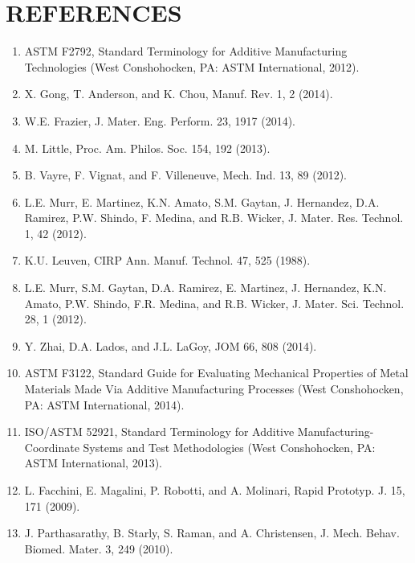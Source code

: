 \documentclass[10pt]{article}
\begin{document}
\section*{REFERENCES}
\begin{enumerate}
  \item ASTM F2792, Standard Terminology for Additive Manufacturing Technologies (West Conshohocken, PA: ASTM International, 2012).

  \item X. Gong, T. Anderson, and K. Chou, Manuf. Rev. 1, 2 (2014).

  \item W.E. Frazier, J. Mater. Eng. Perform. 23, 1917 (2014).

  \item M. Little, Proc. Am. Philos. Soc. 154, 192 (2013).

  \item B. Vayre, F. Vignat, and F. Villeneuve, Mech. Ind. 13, 89 (2012).

  \item L.E. Murr, E. Martinez, K.N. Amato, S.M. Gaytan, J. Hernandez, D.A. Ramirez, P.W. Shindo, F. Medina, and R.B. Wicker, J. Mater. Res. Technol. 1, 42 (2012).

  \item K.U. Leuven, CIRP Ann. Manuf. Technol. 47, 525 (1988).

  \item L.E. Murr, S.M. Gaytan, D.A. Ramirez, E. Martinez, J. Hernandez, K.N. Amato, P.W. Shindo, F.R. Medina, and R.B. Wicker, J. Mater. Sci. Technol. 28, 1 (2012).

  \item Y. Zhai, D.A. Lados, and J.L. LaGoy, JOM 66, 808 (2014).

  \item ASTM F3122, Standard Guide for Evaluating Mechanical Properties of Metal Materials Made Via Additive Manufacturing Processes (West Conshohocken, PA: ASTM International, 2014).

  \item ISO/ASTM 52921, Standard Terminology for Additive Manufacturing-Coordinate Systems and Test Methodologies (West Conshohocken, PA: ASTM International, 2013).

  \item L. Facchini, E. Magalini, P. Robotti, and A. Molinari, Rapid Prototyp. J. 15, 171 (2009).

  \item J. Parthasarathy, B. Starly, S. Raman, and A. Christensen, J. Mech. Behav. Biomed. Mater. 3, 249 (2010).


\end{enumerate}
\end{document}
